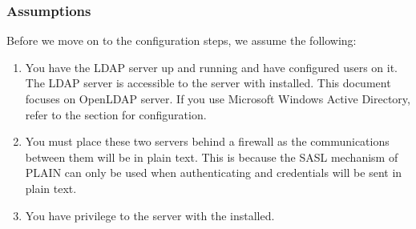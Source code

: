 \documentclass[letterpaper,10pt,english]{sphinxmanual}
\begin{document}
\subsubsection*{Assumptions}

\sphinxAtStartPar
Before we move on to the configuration steps, we assume the following:
\begin{enumerate}
%
\item {} 
\sphinxAtStartPar
You have the LDAP server up and running and have configured users on it. The LDAP server is accessible to the server with  installed. This document focuses on OpenLDAP server. If you use Microsoft Windows Active Directory, refer to the {\hyperref[\detokenize{sasl-auth:windows-ad}]{}} section for  configuration.

\item {} 
\sphinxAtStartPar
You must place these two servers behind a firewall as the communications between them will be in plain text. This is because the SASL mechanism of PLAIN can only be used when authenticating and credentials will be sent in plain text.

\item {} 
\sphinxAtStartPar
You have  privilege to the server with the  installed.

\end{enumerate}
\end{document}
